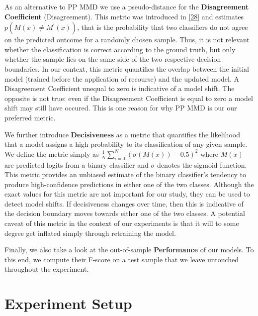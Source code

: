 \documentclass[conference,final,]{IEEEtran}
\theoremstyle{definition}
\theoremstyle{definition}
\theoremstyle{definition}
\theoremstyle{definition}
\theoremstyle{remark}
\begin{document}
As an alternative to PP MMD we use a pseudo-distance for the \textbf{Disagreement Coefficient} (Disagreement). This metric was introduced in \protect\hyperlink{ref-hanneke2007bound}{{[}28{]}} and estimates \(p(M(x) \neq M^\prime(x))\), that is the probability that two classifiers do not agree on the predicted outcome for a randomly chosen sample. Thus, it is not relevant whether the classification is correct according to the ground truth, but only whether the sample lies on the same side of the two respective decision boundaries. In our context, this metric quantifies the overlap between the initial model (trained before the application of recourse) and the updated model. A Disagreement Coefficient unequal to zero is indicative of a model shift. The opposite is not true: even if the Disagreement Coefficient is equal to zero a model shift may still have occured. This is one reason for why PP MMD is our our preferred metric.

We further introduce \textbf{Decisiveness} as a metric that quantifies the likelihood that a model assigns a high probability to its classification of any given sample. We define the metric simply as \({\frac{1}{N}}\sum_{i=0}^N(\sigma(M(x)) - 0.5)^2\) where \(M(x)\) are predicted logits from a binary classifier and \(\sigma\) denotes the sigmoid function. This metric provides an unbiased estimate of the binary classifier's tendency to produce high-confidence predictions in either one of the two classes. Although the exact values for this metric are not important for our study, they can be used to detect model shifts. If decisiveness changes over time, then this is indicative of the decision boundary moves towards either one of the two classes. A potential caveat of this metric in the context of our experiments is that it will to some degree get inflated simply through retraining the model.

Finally, we also take a look at the out-of-sample \textbf{Performance} of our models. To this end, we compute their F-score on a test sample that we leave untouched throughout the experiment.

\hypertarget{empirical}{%
\section{Experiment Setup}\label{empirical}}
\end{document}
